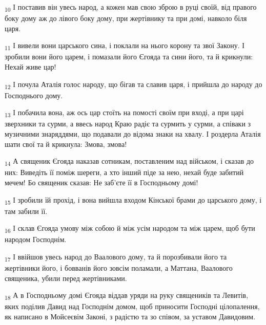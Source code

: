 \begin{tcolorbox}
\textsubscript{10} І поставив він увесь народ, а кожен мав свою зброю в руці своїй, від правого боку дому аж до лівого боку дому, при жертівнику та при домі, навколо біля царя.
\end{tcolorbox}
\begin{tcolorbox}
\textsubscript{11} І вивели вони царського сина, і поклали на нього корону та звої Закону. І зробили вони його царем, і помазали його Єгояда та сини його, та й крикнули: Нехай живе цар!
\end{tcolorbox}
\begin{tcolorbox}
\textsubscript{12} І почула Аталія голос народу, що бігав та славив царя, і прийшла до народу до Господнього дому.
\end{tcolorbox}
\begin{tcolorbox}
\textsubscript{13} І побачила вона, аж ось цар стоїть на помості своїм при вході, а при царі зверхники та сурми, а ввесь народ Краю радіє та сурмить у сурми, а співаки з музичними знаряддями, що подавали до відома знаки на хвалу. І роздерла Аталія шати свої та й крикнула: Змова, змова!
\end{tcolorbox}
\begin{tcolorbox}
\textsubscript{14} А священик Єгояда наказав сотникам, поставленим над військом, і сказав до них: Виведіть її поміж шереги, а хто інший піде за нею, нехай буде забитий мечем! Бо священик сказав: Не заб'єте її в Господньому домі!
\end{tcolorbox}
\begin{tcolorbox}
\textsubscript{15} І зробили їй прохід, і вона вийшла входом Кінської брами до царського дому, і там забили її.
\end{tcolorbox}
\begin{tcolorbox}
\textsubscript{16} І склав Єгояда умову між собою й між усім народом та між царем, щоб бути народом Господнім.
\end{tcolorbox}
\begin{tcolorbox}
\textsubscript{17} І ввійшов увесь народ до Ваалового дому, та й порозбивали його та жертівники його, і бовванів його зовсім поламали, а Маттана, Ваалового священика, убили перед жертівниками.
\end{tcolorbox}
\begin{tcolorbox}
\textsubscript{18} А в Господньому домі Єгояда віддав уряди на руку священиків та Левитів, яких поділив Давид над Господнім домом, щоб приносити Господні цілопалення, як написано в Мойсеєвім Законі, з радістю та зо співом, за уставом Давидовим.
\end{tcolorbox}
